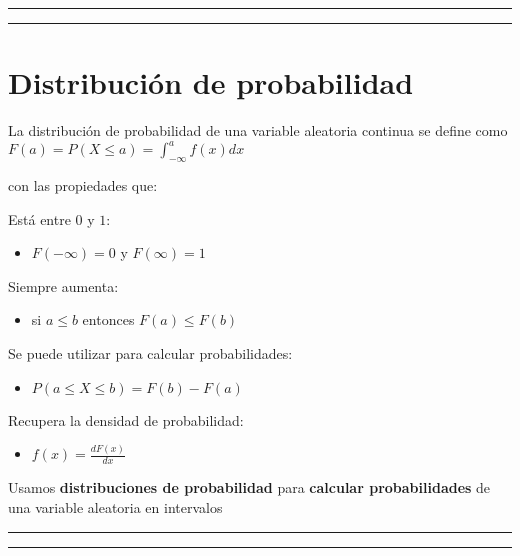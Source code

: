 \documentclass[
]{book}
\providecommand{\tightlist}{%
  \setlength{\itemsep}{0pt}\setlength{\parskip}{0pt}}
\begin{document}
\begin{center}\rule{0.5\linewidth}{0.5pt}\end{center}

\begin{center}\rule{0.5\linewidth}{0.5pt}\end{center}

\hypertarget{distribuciuxf3n-de-probabilidad-3}{%
\section{Distribución de probabilidad}\label{distribuciuxf3n-de-probabilidad-3}}

La distribución de probabilidad de una variable aleatoria continua se define como
\(F(a)=P(X\leq a) =\int_{-\infty} ^a f(x)dx\)

con las propiedades que:

Está entre \(0\) y \(1\):

\begin{itemize}
\tightlist
\item
  \(F(-\infty)= 0\) y \(F(\infty)=1\)
\end{itemize}

Siempre aumenta:

\begin{itemize}
\tightlist
\item
  si \(a\leq b\) entonces \(F(a)\leq F(b)\)
\end{itemize}

Se puede utilizar para calcular probabilidades:

\begin{itemize}
\tightlist
\item
  \(P(a \leq X \leq b)=F(b)-F(a)\)
\end{itemize}

Recupera la densidad de probabilidad:

\begin{itemize}
\tightlist
\item
  \(f(x)=\frac{dF(x)}{dx}\)
\end{itemize}

Usamos \textbf{distribuciones de probabilidad} para \textbf{calcular probabilidades} de una variable aleatoria en intervalos

\begin{center}\rule{0.5\linewidth}{0.5pt}\end{center}

\begin{center}\rule{0.5\linewidth}{0.5pt}\end{center}
\end{document}
